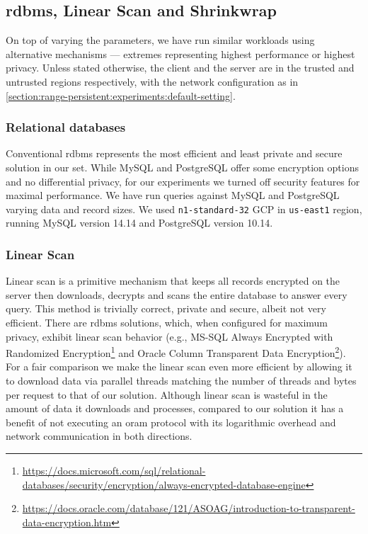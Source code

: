 	\subsection{\texorpdfstring{\acrshort{rdbms}}{RDBMS}, Linear Scan and Shrinkwrap}

		On top of varying the parameters, we have run similar workloads using alternative mechanisms --- extremes representing highest performance or highest privacy.
		Unless stated otherwise, the client and the server are in the trusted and untrusted regions respectively, with the network configuration as in \cref{section:range-persistent:experiments:default-setting}.

		\subsubsection*{Relational databases}

			Conventional \acrshort{rdbms} represents the most efficient and least private and secure solution in our set.
			While MySQL and PostgreSQL offer some encryption options and no differential privacy, for our experiments we turned off security features for maximal performance.
			We have run queries against MySQL and PostgreSQL varying data and record sizes.
			We used \texttt{n1-standard-32} GCP  in \texttt{us-east1} region, running MySQL version 14.14 and PostgreSQL version 10.14.

		\subsubsection*{Linear Scan}

			Linear scan is a primitive mechanism that keeps all records encrypted on the server then downloads, decrypts and scans the entire database to answer every query.
			This method is trivially correct, private and secure, albeit not very efficient.
			There are \acrshort{rdbms} solutions, which, when configured for maximum privacy, exhibit linear scan behavior (e.g., MS-SQL Always Encrypted with Randomized Encryption\footnote{\url{https://docs.microsoft.com/sql/relational-databases/security/encryption/always-encrypted-database-engine}} and Oracle Column Transparent Data Encryption\footnote{\url{https://docs.oracle.com/database/121/ASOAG/introduction-to-transparent-data-encryption.htm}}).
			For a fair comparison we make the linear scan even more efficient by allowing it to download data via parallel threads matching the number of threads and bytes per request to that of our solution.
			Although linear scan is wasteful in the amount of data it downloads and processes, compared to our solution it has a benefit of not executing an \acrshort{oram} protocol with its logarithmic overhead and network communication in both directions.

